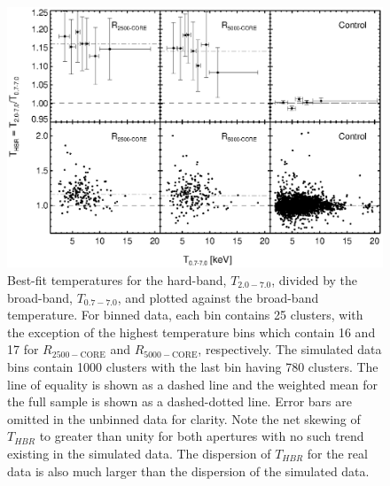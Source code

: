 \clearpage
\begin{figure}
\begin{center}
\includegraphics*[width=\textwidth, trim=0mm 0mm 0mm 0mm, clip]{f3.eps}
\caption{
Best-fit temperatures for the hard-band, $T_{2.0-7.0}$, divided by the
broad-band, $T_{0.7-7.0}$, and plotted against the broad-band
temperature. For binned data, each bin contains 25 clusters, with the
exception of the highest temperature bins which contain 16 and 17 for
$R_{2500-\mathrm{CORE}}$ and $R_{5000-\mathrm{CORE}}$, respectively. The
simulated data bins contain 1000 clusters with the last bin having 780
clusters. The line of equality is shown as a dashed line and the
weighted mean for the full sample is shown as a dashed-dotted
line. Error bars are omitted in the unbinned data for clarity. Note
the net skewing of $T_{HBR}$ to greater than unity for both apertures
with no such trend existing in the simulated data. The dispersion of
$T_{HBR}$ for the real data is also much larger than the dispersion of
the simulated data.
}
\label{fig:ftx}
\end{center}
\end{figure}
\clearpage

